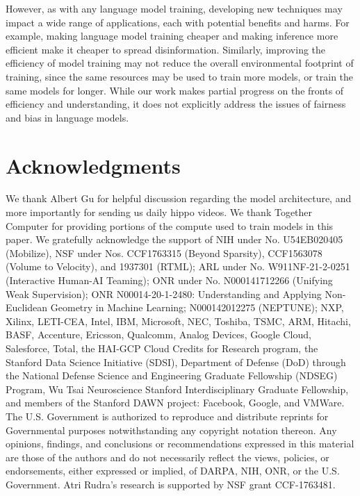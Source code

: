 \documentclass{article}
\begin{document}
However, as with any language model training, developing new techniques may impact a wide range of applications, each with potential benefits and harms.
For example, making language model training cheaper and making inference more efficient make it cheaper to spread disinformation.
Similarly, improving the efficiency of model training may not reduce the overall environmental footprint of training, since the same resources may be used to train more models, or train the same models for longer.
While our work makes partial progress on the fronts of efficiency and understanding, it does not explicitly address the issues of fairness and bias in language models.
\fi
 
\section*{Acknowledgments}

We thank Albert Gu for helpful discussion regarding the model architecture, and
more importantly for sending us daily hippo videos.
We thank Together Computer
for providing portions of the compute used to train models in this paper.
We gratefully acknowledge the support of NIH under No. U54EB020405 (Mobilize), NSF under Nos. CCF1763315 (Beyond Sparsity), CCF1563078 (Volume to Velocity), and 1937301 (RTML); ARL under No. W911NF-21-2-0251 (Interactive Human-AI Teaming); ONR under No. N000141712266 (Unifying Weak Supervision); ONR N00014-20-1-2480: Understanding and Applying Non-Euclidean Geometry in Machine Learning; N000142012275 (NEPTUNE); NXP, Xilinx, LETI-CEA, Intel, IBM, Microsoft, NEC, Toshiba, TSMC, ARM, Hitachi, BASF, Accenture, Ericsson, Qualcomm, Analog Devices, Google Cloud, Salesforce, Total, the HAI-GCP Cloud Credits for Research program,  the Stanford Data Science Initiative (SDSI),
Department of Defense (DoD) through the National Defense Science and
Engineering Graduate Fellowship (NDSEG) Program, 
Wu Tsai Neuroscience Stanford Interdisciplinary Graduate Fellowship,
and members of the Stanford DAWN project: Facebook, Google, and VMWare. The U.S. Government is authorized to reproduce and distribute reprints for Governmental purposes notwithstanding any copyright notation thereon. Any opinions, findings, and conclusions or recommendations expressed in this material are those of the authors and do not necessarily reflect the views, policies, or endorsements, either expressed or implied, of DARPA, NIH, ONR, or the U.S. Government.
Atri Rudra’s research is supported by NSF grant CCF-1763481.
 
\end{document}
